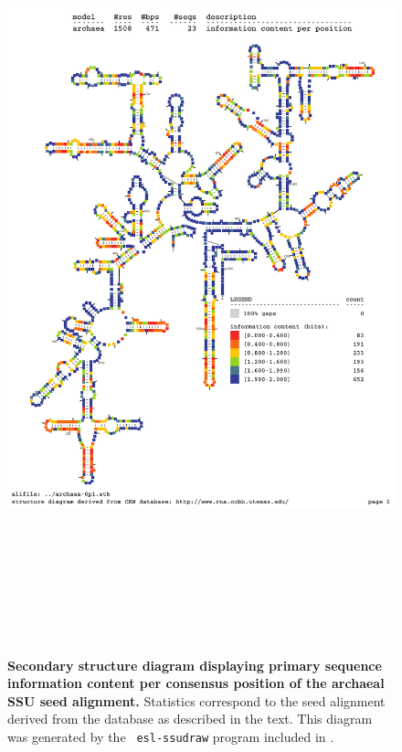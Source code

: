 \vspace{0.2in}
\newpage

\begin{figure}
\begin{center}
\includegraphics[height=9in]{../../seeds/ss-diagrams/archaea-0p1-info}
\end{center}
\caption[Secondary structure diagram displaying primary sequence
  information content per consensus position of the archaeal SSU seed
  alignment]{\textbf{Secondary structure diagram displaying primary
  sequence information content per consensus position of the archaeal SSU seed
  alignment.} Statistics correspond to the  seed
  alignment derived from the  database \cite{CannoneGutell02}
  as described in the text. This diagram was generated by the {\tt
  esl-ssudraw} program included in .}
\label{fig:arcinfo}
\end{figure}

